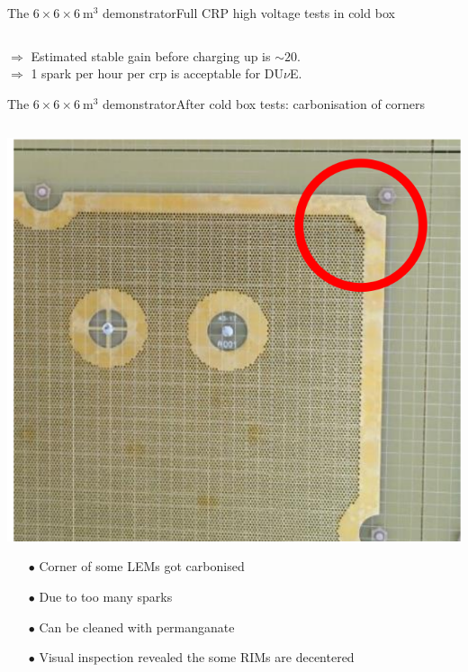 \documentclass[10pt]{beamer}
\begin{document}
\begin{frame}{The \texorpdfstring{$6 \times 6 \times \SI{6}{\meter\cubed}$}{666} demonstrator}{Full CRP high voltage  tests in cold box}
\begin{columns}
\begin{column}{0.65\textwidth}
    		\end{column}
    	\end{columns}
    	\vfill
    	\begin{scriptsize}
	    	$\Rightarrow$ Estimated stable gain before charging up is $\sim20$.\\
	    	$\Rightarrow$ 1 spark per hour per crp is acceptable for DU$\nu$E.
	    \end{scriptsize}
	    \end{frame}
       
       \begin{frame}{The \texorpdfstring{$6 \times 6 \times \SI{6}{\meter\cubed}$}{666} demonstrator}{After cold box tests: carbonisation of corners}
	       	\begin{scriptsize}
	       		\begin{columns}
	       			\begin{column}{0.48\textwidth}
	       				\includegraphics[width=\textwidth]{figures/666/carbonisation.png}\\
	       				\vfill
	       				\begin{itemize}
	       					\item[$\bullet$] Corner of some LEMs got carbonised
	       					\item[$\bullet$] Due to too many sparks
	       					\item[$\bullet$] Can be cleaned with permanganate
	       					\item[$\bullet$] Visual inspection revealed the some RIMs are decentered

\end{itemize}
\end{column}
\end{columns}
\end{scriptsize}
\end{frame}
\end{document}
